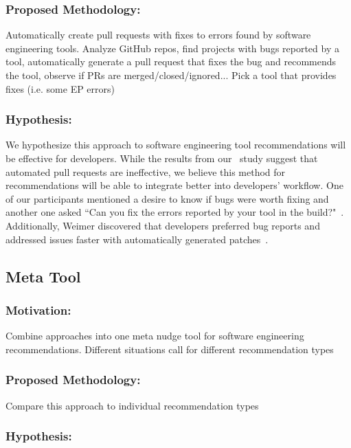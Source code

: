 \subsubsection{Proposed Methodology:}

Automatically create pull requests with fixes to errors found by software engineering tools. Analyze GitHub repos, find projects with bugs reported by a tool, automatically generate a pull request that fixes the bug and recommends the tool, observe if PRs are merged/closed/ignored... Pick a tool that provides fixes (i.e. some EP errors)

\subsubsection{Hypothesis:}

We hypothesize this approach to software engineering tool recommendations will be effective for developers. While the results from our \tele~study suggest that automated pull requests are ineffective, we believe this method for recommendations will be able to integrate better into developers' workflow. One of our participants mentioned a desire to know if bugs were worth fixing and another one asked ``Can you fix
the errors reported by your tool in the build?"~\cite{SorryToBotherYou}. Additionally, Weimer discovered that developers preferred bug reports and addressed issues faster with automatically generated patches~\cite{WeimerPatch}.

\subsection{Meta Tool}

\subsubsection{Motivation:}

Combine approaches into one meta nudge tool for software engineering recommendations. Different situations call for different recommendation types

\subsubsection{Proposed Methodology:}

Compare this approach to individual recommendation types

\subsubsection{Hypothesis:}

